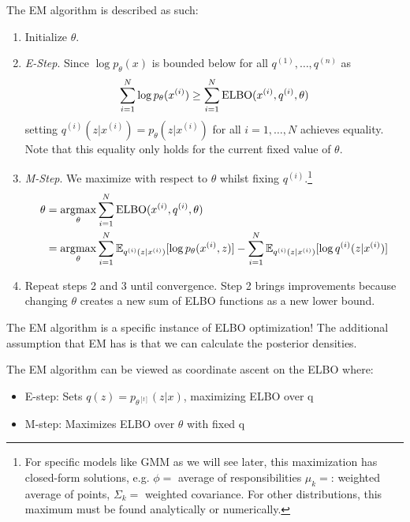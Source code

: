   \begin{algo}[EM Algorithm]
    The EM algorithm is described as such: 
    \begin{enumerate}
      \item Initialize $\theta$.
      \item \textit{E-Step}. Since $\log p_\theta(x)$ is bounded below for all $q^{(1)}, \ldots, q^{(n)}$ as 
      \begin{equation}
        \sum_{i=1}^N \log p_\theta(x^{(i)}) \geq \sum_{i=1}^N \elbo(x^{(i)}, q^{(i)}, \theta)
      \end{equation}
      setting $q^{(i)}(z|x^{(i)}) = p_\theta(z|x^{(i)})$ for all $i = 1, \ldots, N$ achieves equality. Note that this equality only holds for the current fixed value of $\theta$.

      \item \textit{M-Step}. We maximize with respect to $\theta$ whilst fixing $q^{(i)}$.\footnote{For specific models like GMM as we will see later, this maximization has closed-form solutions, e.g. $\phi = $ average of responsibilities $\mu_k = $: weighted average of points, $\Sigma_k = $ weighted covariance. For other distributions, this maximum must be found analytically or numerically.}
      \begin{align}  
        \theta & = \argmax_\theta \sum_{i=1}^N \elbo(x^{(i)}, q^{(i)}, \theta) \\
        & = \argmax_\theta \sum_{i=1}^N \mathbb{E}_{q^{(i)}(z|x^{(i)})}[\log p_\theta(x^{(i)}, z)] - \sum_{i=1}^N \mathbb{E}_{q^{(i)}(z|x^{(i)})}[\log q^{(i)}(z|x^{(i)})]
      \end{align}

      \item Repeat steps 2 and 3 until convergence. Step 2 brings improvements because changing $\theta$ creates a new sum of ELBO functions as a new lower bound.
    \end{enumerate}
  \end{algo}

  The EM algorithm is a specific instance of ELBO optimization! The additional assumption that EM has is that we can calculate the posterior densities. 

  \begin{corollary}
    The EM algorithm can be viewed as coordinate ascent on the ELBO where:
    \begin{itemize}
      \item E-step: Sets $q(z) = p_{\theta^{[t]}}(z|x)$, maximizing ELBO over q
      \item M-step: Maximizes ELBO over $\theta$ with fixed q
    \end{itemize}
  \end{corollary}

